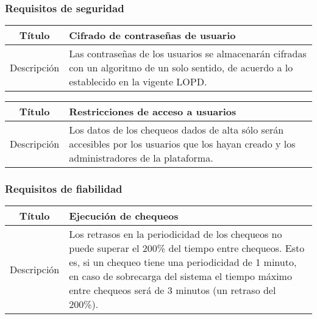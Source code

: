 \subsubsection{Requisitos de seguridad}

\begin{center}
  
  \begin{tabularx}{\textwidth}{|c|X|}
    \hline
    Título & Cifrado de contraseñas de usuario \\

    \hline

    Descripción & Las contraseñas de los usuarios se almacenarán cifradas con un
    algoritmo de un solo sentido, de acuerdo a lo establecido en la vigente \ac{LOPD}. \\


    \hline
  \end{tabularx}
\end{center}

\begin{center}
  
  \begin{tabularx}{\textwidth}{|c|X|}
    \hline
    Título & Restricciones de acceso a usuarios \\

    \hline

    Descripción & Los datos de los chequeos dados de alta sólo serán accesibles
    por los usuarios que los hayan creado y los administradores de la plataforma. \\


    \hline
  \end{tabularx}
\end{center}

\FloatBarrier
\subsubsection{Requisitos de fiabilidad}


\begin{center}
  
  \begin{tabularx}{\textwidth}{|c|X|}
    \hline
    Título & Ejecución de chequeos \\

    \hline

    Descripción & Los retrasos en la periodicidad de los chequeos no puede
    superar el 200\% del tiempo entre chequeos. Esto es, si un chequeo tiene una
    periodicidad de 1 minuto, en caso de sobrecarga del sistema el tiempo máximo
    entre chequeos será de 3 minutos (un retraso del 200\%). \\

    \hline
  \end{tabularx}
\end{center}


